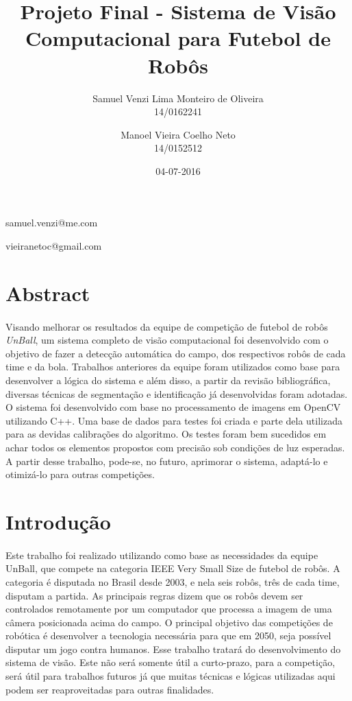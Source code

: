 \documentclass[conference, harvard, brazil, english]{sbatex}
\begin{document}
	\title{Projeto Final - Sistema de Visão Computacional para Futebol de Robôs}
	\date{04-07-2016}
	\author{Samuel Venzi Lima Monteiro de Oliveira\\14/0162241}{samuel.venzi@me.com}
	
	\author{Manoel Vieira Coelho Neto\\14/0152512}{vieiranetoc@gmail.com}
	
	
	\section{Abstract}
		\paragraph{}
		Visando melhorar os resultados da equipe de competição de futebol de robôs \textit{UnBall}, um sistema completo de visão computacional foi desenvolvido com o objetivo de fazer a detecção automática do campo, dos respectivos robôs de cada time e da bola. Trabalhos anteriores da equipe foram utilizados como base para desenvolver a lógica do sistema e além disso, a partir da revisão bibliográfica, diversas técnicas de segmentação e identificação já desenvolvidas foram adotadas. O sistema foi desenvolvido com base no processamento de imagens em OpenCV utilizando C++. Uma base de dados para testes foi criada e parte dela utilizada para as devidas calibrações do algoritmo. Os testes foram bem sucedidos em achar todos os elementos propostos com precisão sob condições de luz esperadas. A partir desse trabalho, pode-se, no futuro, aprimorar o sistema, adaptá-lo e otimizá-lo para outras competições.
		
	\section{Introdução}
		\paragraph{}
		Este trabalho foi realizado utilizando como base as necessidades da equipe UnBall, que compete na categoria IEEE Very Small Size de futebol de robôs. A categoria é disputada no Brasil desde 2003, e nela seis robôs, três de cada time, disputam a partida. As principais regras dizem que os robôs devem ser controlados remotamente por um computador que processa a imagem de uma câmera posicionada acima do campo. O principal objetivo das competições de robótica é desenvolver a tecnologia necessária para que em 2050, seja possível disputar um jogo contra humanos. Esse trabalho tratará do desenvolvimento do sistema de visão. Este não será somente útil a curto-prazo, para a competição, será útil para trabalhos futuros já que muitas técnicas e lógicas utilizadas aqui podem ser reaproveitadas para outras finalidades.
\end{document}
